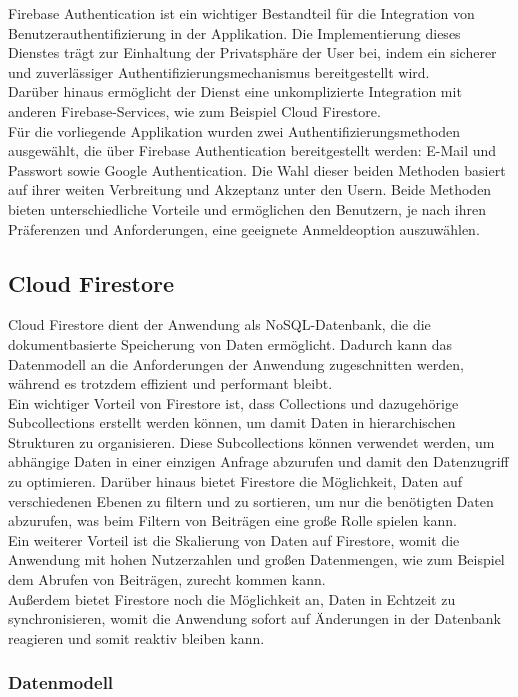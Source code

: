 Firebase Authentication ist ein wichtiger Bestandteil für die Integration von Benutzerauthentifizierung in der Applikation. Die Implementierung dieses Dienstes trägt zur Einhaltung der Privatsphäre der User bei, indem ein sicherer und zuverlässiger Authentifizierungsmechanismus bereitgestellt wird.
\\
Darüber hinaus ermöglicht der Dienst eine unkomplizierte Integration mit anderen Firebase-Services, wie zum Beispiel Cloud Firestore.
\\
Für die vorliegende Applikation wurden zwei Authentifizierungsmethoden ausgewählt, die über Firebase Authentication bereitgestellt werden: E-Mail und Passwort sowie Google Authentication. Die Wahl dieser beiden Methoden basiert auf ihrer weiten Verbreitung und Akzeptanz unter den Usern. Beide Methoden bieten unterschiedliche Vorteile und ermöglichen den Benutzern, je nach ihren Präferenzen und Anforderungen, eine geeignete Anmeldeoption auszuwählen.


\subsection{Cloud Firestore}
Cloud Firestore dient der Anwendung als NoSQL-Datenbank, die die dokumentbasierte Speicherung von Daten ermöglicht. Dadurch kann das Datenmodell an die Anforderungen der Anwendung zugeschnitten werden, während es trotzdem effizient und performant bleibt.
\\
Ein wichtiger Vorteil von Firestore ist, dass Collections und dazugehörige Subcollections erstellt werden können, um damit Daten in hierarchischen Strukturen zu organisieren. Diese Subcollections können verwendet werden, um abhängige Daten in einer einzigen Anfrage abzurufen und damit den Datenzugriff zu optimieren. Darüber hinaus bietet Firestore die Möglichkeit, Daten auf verschiedenen Ebenen zu filtern und zu sortieren, um nur die benötigten Daten abzurufen, was beim Filtern von Beiträgen eine große Rolle spielen kann.
\\
Ein weiterer Vorteil ist die Skalierung von Daten auf Firestore, womit die Anwendung mit hohen Nutzerzahlen und großen Datenmengen, wie zum Beispiel dem Abrufen von Beiträgen, zurecht kommen kann.
\\
Außerdem bietet Firestore noch die Möglichkeit an, Daten in Echtzeit zu synchronisieren, womit die Anwendung sofort auf Änderungen in der Datenbank reagieren und somit reaktiv bleiben kann.


\subsubsection{Datenmodell}

